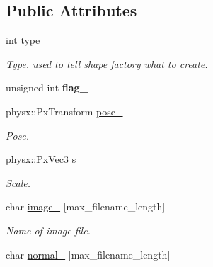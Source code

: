 \subsection*{\-Public \-Attributes}
\begin{DoxyCompactItemize}
\item 
\hypertarget{classNeb_1_1Shape_1_1Raw_ae4588d516d6dc605f6a3444a8bb3ed54}{int \hyperlink{classNeb_1_1Shape_1_1Raw_ae4588d516d6dc605f6a3444a8bb3ed54}{type\-\_\-}}\label{classNeb_1_1Shape_1_1Raw_ae4588d516d6dc605f6a3444a8bb3ed54}

\begin{DoxyCompactList}\small\item\em \-Type. used to tell shape factory what to create. \end{DoxyCompactList}\item 
\hypertarget{classNeb_1_1Shape_1_1Raw_a82ad86a170c5280bc618f79759d28395}{unsigned int {\bfseries flag\-\_\-}}\label{classNeb_1_1Shape_1_1Raw_a82ad86a170c5280bc618f79759d28395}

\item 
\hypertarget{classNeb_1_1Shape_1_1Raw_a4cc2fcb9e81c238a3d500db1b5d20f9f}{physx\-::\-Px\-Transform \hyperlink{classNeb_1_1Shape_1_1Raw_a4cc2fcb9e81c238a3d500db1b5d20f9f}{pose\-\_\-}}\label{classNeb_1_1Shape_1_1Raw_a4cc2fcb9e81c238a3d500db1b5d20f9f}

\begin{DoxyCompactList}\small\item\em \-Pose. \end{DoxyCompactList}\item 
\hypertarget{classNeb_1_1Shape_1_1Raw_a19f3eea941f04510b8b9dfcc38d453aa}{physx\-::\-Px\-Vec3 \hyperlink{classNeb_1_1Shape_1_1Raw_a19f3eea941f04510b8b9dfcc38d453aa}{s\-\_\-}}\label{classNeb_1_1Shape_1_1Raw_a19f3eea941f04510b8b9dfcc38d453aa}

\begin{DoxyCompactList}\small\item\em \-Scale. \end{DoxyCompactList}\item 
\hypertarget{classNeb_1_1Shape_1_1Raw_ac868d3e6b52bd1cdca2a19d21e9d030c}{char \hyperlink{classNeb_1_1Shape_1_1Raw_ac868d3e6b52bd1cdca2a19d21e9d030c}{image\-\_\-} \mbox{[}max\-\_\-filename\-\_\-length\mbox{]}}\label{classNeb_1_1Shape_1_1Raw_ac868d3e6b52bd1cdca2a19d21e9d030c}

\begin{DoxyCompactList}\small\item\em \-Name of image file. \end{DoxyCompactList}\item 
\hypertarget{classNeb_1_1Shape_1_1Raw_a8d5db26dbd8b92368a4a0e024053d134}{char \hyperlink{classNeb_1_1Shape_1_1Raw_a8d5db26dbd8b92368a4a0e024053d134}{normal\-\_\-} \mbox{[}max\-\_\-filename\-\_\-length\mbox{]}}\label{classNeb_1_1Shape_1_1Raw_a8d5db26dbd8b92368a4a0e024053d134}


\end{DoxyCompactItemize}
